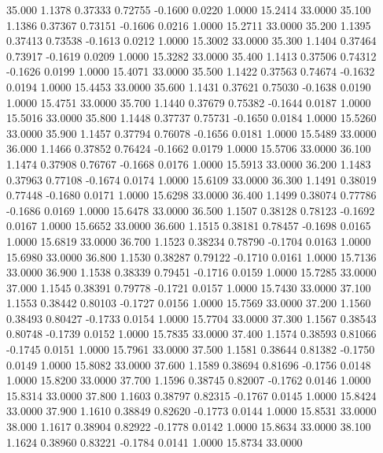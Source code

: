   35.000   1.1378   0.37333   0.72755  -0.1600   0.0220   1.0000  15.2414  33.0000
  35.100   1.1386   0.37367   0.73151  -0.1606   0.0216   1.0000  15.2711  33.0000
  35.200   1.1395   0.37413   0.73538  -0.1613   0.0212   1.0000  15.3002  33.0000
  35.300   1.1404   0.37464   0.73917  -0.1619   0.0209   1.0000  15.3282  33.0000
  35.400   1.1413   0.37506   0.74312  -0.1626   0.0199   1.0000  15.4071  33.0000
  35.500   1.1422   0.37563   0.74674  -0.1632   0.0194   1.0000  15.4453  33.0000
  35.600   1.1431   0.37621   0.75030  -0.1638   0.0190   1.0000  15.4751  33.0000
  35.700   1.1440   0.37679   0.75382  -0.1644   0.0187   1.0000  15.5016  33.0000
  35.800   1.1448   0.37737   0.75731  -0.1650   0.0184   1.0000  15.5260  33.0000
  35.900   1.1457   0.37794   0.76078  -0.1656   0.0181   1.0000  15.5489  33.0000
  36.000   1.1466   0.37852   0.76424  -0.1662   0.0179   1.0000  15.5706  33.0000
  36.100   1.1474   0.37908   0.76767  -0.1668   0.0176   1.0000  15.5913  33.0000
  36.200   1.1483   0.37963   0.77108  -0.1674   0.0174   1.0000  15.6109  33.0000
  36.300   1.1491   0.38019   0.77448  -0.1680   0.0171   1.0000  15.6298  33.0000
  36.400   1.1499   0.38074   0.77786  -0.1686   0.0169   1.0000  15.6478  33.0000
  36.500   1.1507   0.38128   0.78123  -0.1692   0.0167   1.0000  15.6652  33.0000
  36.600   1.1515   0.38181   0.78457  -0.1698   0.0165   1.0000  15.6819  33.0000
  36.700   1.1523   0.38234   0.78790  -0.1704   0.0163   1.0000  15.6980  33.0000
  36.800   1.1530   0.38287   0.79122  -0.1710   0.0161   1.0000  15.7136  33.0000
  36.900   1.1538   0.38339   0.79451  -0.1716   0.0159   1.0000  15.7285  33.0000
  37.000   1.1545   0.38391   0.79778  -0.1721   0.0157   1.0000  15.7430  33.0000
  37.100   1.1553   0.38442   0.80103  -0.1727   0.0156   1.0000  15.7569  33.0000
  37.200   1.1560   0.38493   0.80427  -0.1733   0.0154   1.0000  15.7704  33.0000
  37.300   1.1567   0.38543   0.80748  -0.1739   0.0152   1.0000  15.7835  33.0000
  37.400   1.1574   0.38593   0.81066  -0.1745   0.0151   1.0000  15.7961  33.0000
  37.500   1.1581   0.38644   0.81382  -0.1750   0.0149   1.0000  15.8082  33.0000
  37.600   1.1589   0.38694   0.81696  -0.1756   0.0148   1.0000  15.8200  33.0000
  37.700   1.1596   0.38745   0.82007  -0.1762   0.0146   1.0000  15.8314  33.0000
  37.800   1.1603   0.38797   0.82315  -0.1767   0.0145   1.0000  15.8424  33.0000
  37.900   1.1610   0.38849   0.82620  -0.1773   0.0144   1.0000  15.8531  33.0000
  38.000   1.1617   0.38904   0.82922  -0.1778   0.0142   1.0000  15.8634  33.0000
  38.100   1.1624   0.38960   0.83221  -0.1784   0.0141   1.0000  15.8734  33.0000
